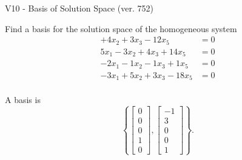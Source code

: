 \begin{exercise}
  \begin{exerciseTitle}V10 - Basis of Solution Space (ver. 752)\end{exerciseTitle}
  \begin{exerciseStatement}
    Find a basis for the solution space of the homogeneous system 
\begin{align*}
 + 4 x_ 2 + 3 x_ 3 -12 x_ 5 &= 0  \\ 
  5 x_ 1 -3 x_ 2 + 4 x_ 3 + 14 x_ 5 &= 0  \\ 
  -2 x_ 1 -1 x_ 2 -1 x_ 3 + 1 x_ 5 &= 0  \\ 
  -3 x_ 1 + 5 x_ 2 + 3 x_ 3 -18 x_ 5 &= 0  \\ 
 \end{align*}


 
  \end{exerciseStatement}

  \begin{exerciseAnswer}
   A basis is   
\[\left\{\left[\begin{array}{c}
0 \\
0 \\
0 \\
1 \\
0
\end{array}\right] , \left[\begin{array}{c}
-1 \\
3 \\
0 \\
0 \\
1
\end{array}\right]\right\}.\]

  


  \end{exerciseAnswer}
\end{exercise}